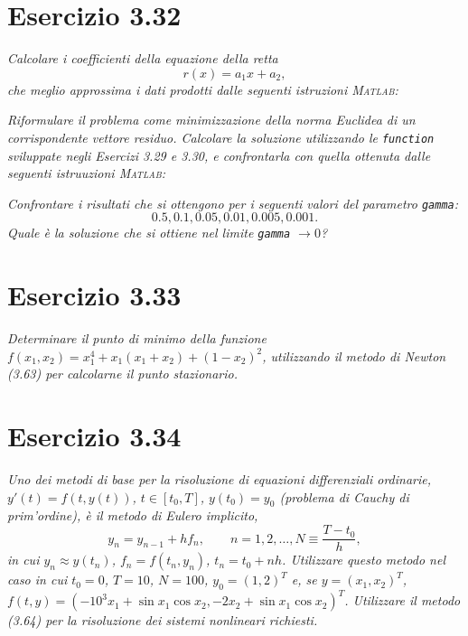 \section{Esercizio 3.32}
\emph{Calcolare i coefficienti della equazione della retta
$$r(x)=a_1x+a_2,$$
che meglio approssima i dati prodotti dalle seguenti istruzioni \textsc{Matlab}:}

\emph{Riformulare il problema come minimizzazione della norma Euclidea di un corrispondente vettore residuo. Calcolare la soluzione utilizzando le \lstinline{function} sviluppate negli Esercizi 3.29 e 3.30, e confrontarla con quella ottenuta dalle seguenti istruuzioni \textsc{Matlab}:}

\emph{Confrontare i risultati che si ottengono per i seguenti valori del parametro \lstinline{gamma}:
$$0.5,0.1,0.05,0.01,0.005,0.001.$$
Quale è la soluzione che si ottiene nel limite \lstinline{gamma} $\rightarrow 0$?}
\section{Esercizio 3.33}
\emph{Determinare il punto di minimo della funzione $f(x_1,x_2)=x_1^4+x_1(x_1+x_2)+(1-x_2)^2$, utilizzando il metodo di Newton (3.63) per calcolarne il punto stazionario.}
\section{Esercizio 3.34}
\emph{Uno dei metodi di base per la risoluzione di equazioni differenziali ordinarie, $y'(t)=f(t,y(t))$, $t\in[t_0,T]$, $y(t_0)=y_0$ (problema di Cauchy di prim'ordine), è il metodo di Eulero implicito,
$$y_n=y_{n-1}+hf_n,\qquad n=1,2,\dots,N\equiv\frac{T-t_0}{h},$$
in cui $y_n\approx y(t_n)$, $f_n=f(t_n,y_n)$, $t_n=t_0+nh$. Utilizzare questo metodo nel caso in cui $t_0=0$, $T=10$, $N=100$, $y_0=(1,2)^T$ e, se $y=(x_1,x_2)^T$, $f(t,y)=(-10^3x_1+\sin x_1\cos x_2, -2x_2+\sin x_1 \cos x_2)^T$. Utilizzare il metodo (3.64) per la risoluzione dei sistemi nonlineari richiesti.}
